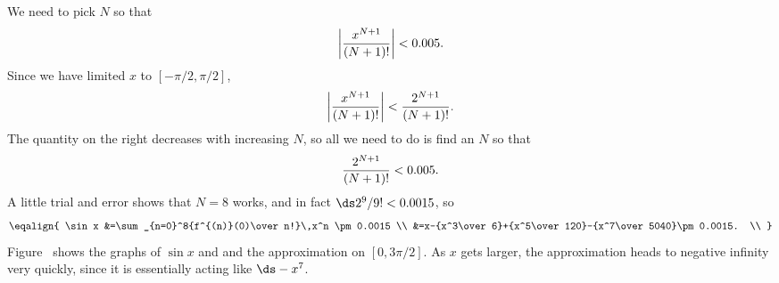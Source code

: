 \begin{theorem}
\begin{example}
We need to pick $N$ so that 
$$\left|{x^{N+1}\over (N+1)!}\right|< 0.005.$$
Since we have limited $x$ to $[-\pi/2,\pi/2]$,
$$\left|{x^{N+1}\over (N+1)!}\right|<{2^{N+1}\over (N+1)!}.$$
The quantity on the right decreases with increasing $N$, so all we
need to do is find an $N$ so that 
$${2^{N+1}\over (N+1)!}<0.005.$$
A little trial and error shows that $N=8$ works, 
and in fact $\ds 2^{9}/9!<0.0015$, so 
$$\eqalign{
  \sin x &=\sum_{n=0}^8{f^{(n)}(0)\over n!}\,x^n \pm 0.0015 \\
  &=x-{x^3\over 6}+{x^5\over 120}-{x^7\over 5040}\pm 0.0015. \\
}$$
Figure~ shows the graphs of $\sin x$ and
and the approximation on $[0,3\pi/2]$. As $x$ gets larger, the
approximation heads to negative infinity very quickly, since it is
essentially acting like $\ds -x^7$.
\end{example}


\end{theorem}
